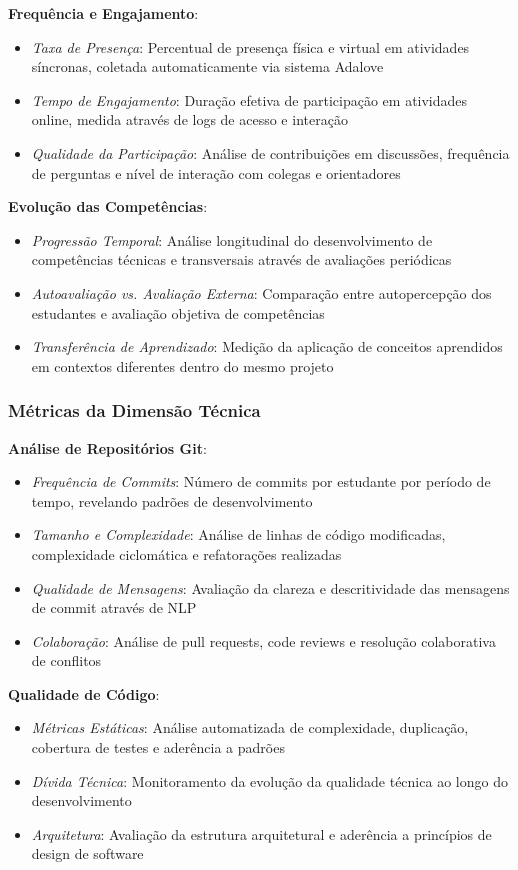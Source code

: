 \documentclass[12pt,a4paper]{article}
\begin{document}
\textbf{Frequência e Engajamento}: 
\begin{itemize}
\item \textit{Taxa de Presença}: Percentual de presença física e virtual em atividades síncronas, coletada automaticamente via sistema Adalove
\item \textit{Tempo de Engajamento}: Duração efetiva de participação em atividades online, medida através de logs de acesso e interação
\item \textit{Qualidade da Participação}: Análise de contribuições em discussões, frequência de perguntas e nível de interação com colegas e orientadores
\end{itemize}

\textbf{Evolução das Competências}:
\begin{itemize}
\item \textit{Progressão Temporal}: Análise longitudinal do desenvolvimento de competências técnicas e transversais através de avaliações periódicas
\item \textit{Autoavaliação vs. Avaliação Externa}: Comparação entre autopercepção dos estudantes e avaliação objetiva de competências
\item \textit{Transferência de Aprendizado}: Medição da aplicação de conceitos aprendidos em contextos diferentes dentro do mesmo projeto
\end{itemize}

\subsubsection{Métricas da Dimensão Técnica}

\textbf{Análise de Repositórios Git}:
\begin{itemize}
\item \textit{Frequência de Commits}: Número de commits por estudante por período de tempo, revelando padrões de desenvolvimento
\item \textit{Tamanho e Complexidade}: Análise de linhas de código modificadas, complexidade ciclomática e refatorações realizadas
\item \textit{Qualidade de Mensagens}: Avaliação da clareza e descritividade das mensagens de commit através de NLP
\item \textit{Colaboração}: Análise de pull requests, code reviews e resolução colaborativa de conflitos
\end{itemize}

\textbf{Qualidade de Código}:
\begin{itemize}
\item \textit{Métricas Estáticas}: Análise automatizada de complexidade, duplicação, cobertura de testes e aderência a padrões
\item \textit{Dívida Técnica}: Monitoramento da evolução da qualidade técnica ao longo do desenvolvimento
\item \textit{Arquitetura}: Avaliação da estrutura arquitetural e aderência a princípios de design de software
\end{itemize}
\end{document}
